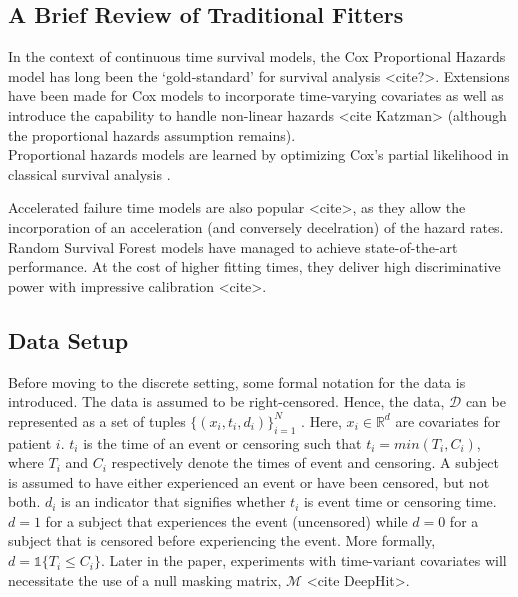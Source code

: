 \documentclass[%
 reprint,
 amsmath,amssymb,
 aps,
]{revtex4-2}
\begin{document}
\subsection{\label{trad_fits}A Brief Review of Traditional Fitters}
In the context of continuous time survival models, the Cox Proportional Hazards model has long been the `gold-standard' for survival analysis <cite?>. Extensions have been made for Cox models to incorporate time-varying covariates as well as introduce the capability to handle non-linear hazards <cite Katzman> (although the proportional hazards assumption remains).\\

Proportional hazards models are learned by optimizing Cox’s partial likelihood in classical survival analysis \cite{raykar_cindex}.

Accelerated failure time models are also popular <cite>, as they allow the incorporation of an acceleration (and conversely decelration) of the hazard rates.\\

Random Survival Forest models have managed to achieve state-of-the-art performance. At the cost of higher fitting times, they deliver high discriminative power with impressive calibration <cite>.\\

\subsection{\label{setting}Data Setup}
Before moving to the discrete setting, some formal notation for the data is introduced. The data is assumed to be right-censored. Hence, the data, $\mathcal{D}$ can be represented as a set of tuples $\{(x_i , t_i , d_i)\}_{i=1}^{N}$  \cite{nagpal_deep_2021}. Here, $x_i \in \mathbb{R}^d$ are covariates for patient $i$. $t_i$ is the time of an event or censoring such that $t_i = min(T_i, C_i)$, where $T_i$ and $C_i$ respectively denote the times of event and censoring. A subject is assumed to have either experienced an event or have been censored, but not both. $d_i$ is an indicator that signifies whether $t_i$ is event time or censoring time. $d=1$ for a subject that experiences the event (uncensored) while $d=0$ for a subject that is censored before experiencing the event. More formally, $d= \mathbb{1}\{T_i \le C_i\}$. Later in the paper, experiments with time-variant covariates will necessitate the use of a null masking matrix, $\mathcal{M}$ <cite DeepHit>.\\
\end{document}
